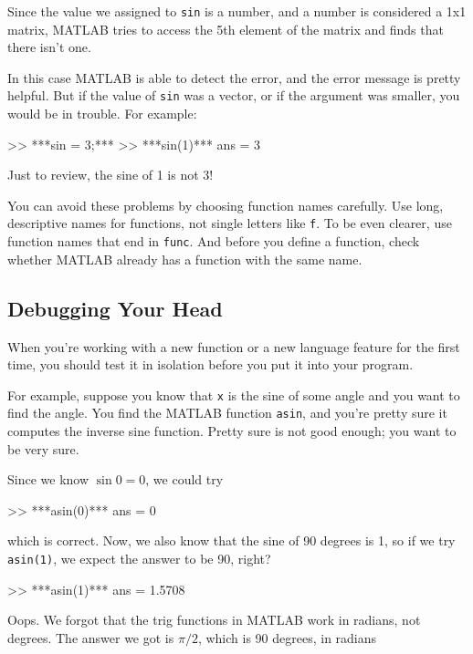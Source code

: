 Since the value we assigned to {\tt sin} is a number, and a number is considered a 1x1 matrix, MATLAB tries to access the 5th element of the matrix and finds that there isn't one.

In this case MATLAB is able to detect the error, and the error message is pretty helpful.
But if the value of {\tt sin} was a vector, or if the argument was smaller, you would be in trouble.  For example:

\begin{code}
>> ***sin = 3;***
>> ***sin(1)***
ans = 3
\end{code}

Just to review, the sine of 1 is not 3!

You can avoid these problems by choosing function names carefully. Use long, descriptive names for functions, not single letters like {\tt f}. To be even clearer, use function names that end in {\tt func}. And before you define a function, check whether MATLAB already has a function with the same name.

\subsection{Debugging Your Head}

When you're working with a new function or a new language feature
for the first time, you should test it in isolation before you
put it into your program.


For example, suppose you know that {\tt x} is the sine of some
angle and you want to find the angle.  You find the MATLAB function
{\tt asin}, and you're pretty sure it computes the inverse sine
function.  Pretty sure is not good enough; you want to be very sure.

Since we know $\sin 0 = 0$, we could try

\begin{code}
>> ***asin(0)***
ans = 0
\end{code}

which is correct.  Now, we also know that the sine of 90 degrees is
1, so if we try {\tt asin(1)}, we expect the answer to be 90, right?

\begin{code}
>> ***asin(1)***
ans = 1.5708
\end{code}

Oops.  We forgot that the trig functions in MATLAB work in radians,
not degrees.  The answer we got is $\pi/2$, which is 90 degrees, in radians

